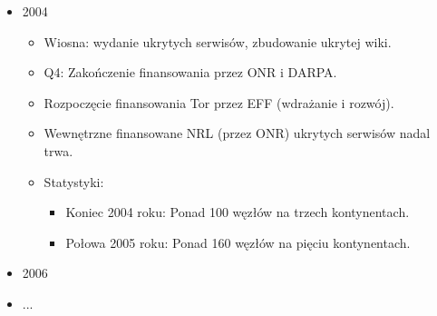 \begin{itemize}
  \item 2004
  \begin{itemize}
   \item Wiosna: wydanie ukrytych serwisów, zbudowanie ukrytej wiki.
   \item Q4: Zakończenie finansowania przez ONR i DARPA. 
   \item Rozpoczęcie finansowania Tor przez EFF (wdrażanie i rozwój).
   \item Wewnętrzne finansowane NRL (przez ONR) ukrytych serwisów nadal trwa.
   \item Statystyki: 
   \begin{itemize}
    \item Koniec 2004 roku: Ponad 100 węzłów na trzech kontynentach.
    \item Połowa 2005 roku: Ponad 160 węzłów na pięciu kontynentach.
   \end{itemize}
  \end{itemize}

  \item 2006
  \item ...
\end{itemize}
